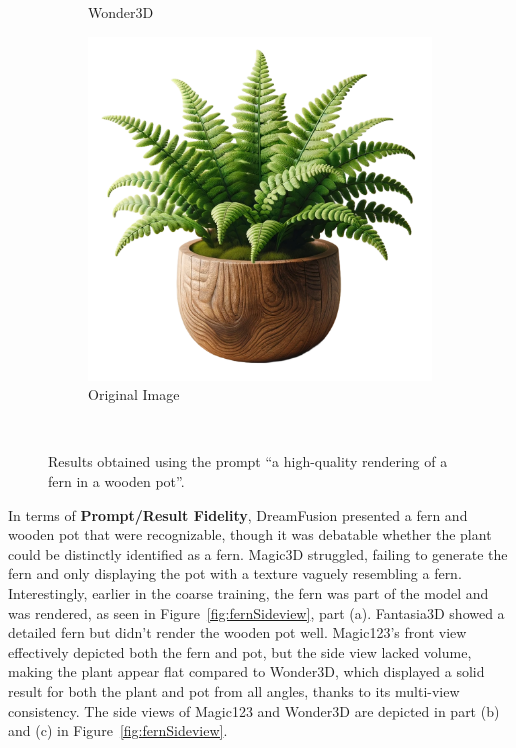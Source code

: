 \begin{figure}[ht]
\begin{subfigure}[b]{0.27\textwidth}
        \caption{Wonder3D}
        \vspace{0.1cm}
    \end{subfigure}
    \begin{subfigure}[b]{0.28\textwidth}
        \centering
        \includegraphics[width=\textwidth]{figures/input/fern.png}
        \caption{Original Image}
        \vspace{0.1cm}
    \end{subfigure}
    \caption{Results obtained using the prompt ``a high-quality rendering of a fern in a wooden pot''.}~\label{fig:resultFern}
\end{figure}

In terms of \textbf{Prompt/Result Fidelity}, DreamFusion presented a fern and wooden pot that were recognizable, though it was debatable whether the plant could be distinctly identified as a fern. Magic3D struggled, failing to generate the fern and only displaying the pot with a texture vaguely resembling a fern. Interestingly, earlier in the coarse training, the fern was part of the model and was rendered, as seen in Figure~\ref{fig:fernSideview}, part (a). Fantasia3D showed a detailed fern but didn't render the wooden pot well. Magic123's front view effectively depicted both the fern and pot, but the side view lacked volume, making the plant appear flat compared to Wonder3D, which displayed a solid result for both the plant and pot from all angles, thanks to its multi-view consistency. The side views of Magic123 and Wonder3D are depicted in part (b) and (c) in Figure~\ref{fig:fernSideview}.\\

